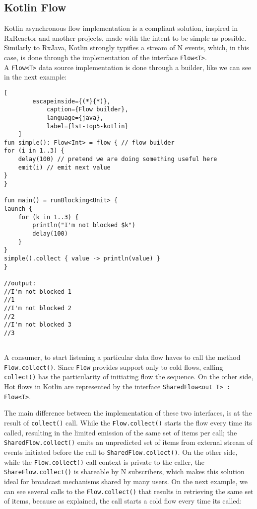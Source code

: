 \subsection{Kotlin Flow}

Kotlin asynchronous flow implementation is a \cite{ReactiveStreams} compliant solution, inspired in RxReactor and another projects, made with the intent to be simple as possible. Similarly to RxJava, Kotlin strongly typifies a stream of N events, which, in this case, is done through the implementation of the interface \texttt{Flow<T>}.\\
A \texttt{Flow<T>} data source implementation is done through a builder, like we can see in the next example:


\begin{center}
	\lstset{basicstyle=\scriptsize\ttfamily,frame=bottomline}
	\begin{minipage}[t][][b]{.46\textwidth}
	\begin{lstlisting}[
		escapeinside={(*}{*)},
			caption={Flow builder},
			language={java},
			label={lst-top5-kotlin}
	]
fun simple(): Flow<Int> = flow { // flow builder
for (i in 1..3) {
	delay(100) // pretend we are doing something useful here
	emit(i) // emit next value
}
}

fun main() = runBlocking<Unit> {
launch {
	for (k in 1..3) {
		println("I'm not blocked $k")
		delay(100)
	}
}
simple().collect { value -> println(value) } 
}

//output:
//I'm not blocked 1
//1
//I'm not blocked 2
//2
//I'm not blocked 3
//3
	
	\end{lstlisting}
	\end{minipage}
\end{center}


A consumer, to start listening a particular data flow haves to call the method \texttt{Flow.collect()}. Since \texttt{Flow} provides support only to cold flows, calling \texttt{collect()} has the particularity of initiating flow the sequence.
On the other side, Hot flows in Kotlin are represented by the interface \texttt{SharedFlow<out T> : Flow<T>}. 

The main difference between the implementation of these two interfaces, is at the result of \texttt{collect()} call. 
While the \texttt{Flow.collect()} starts the flow every time its called, resulting in the limited emission of the same set of items per call; the \texttt{SharedFlow.collect()} emits an unpredicted set of items from external stream of events initiated before the call to \texttt{SharedFlow.collect()}.
On the other side, while the \texttt{Flow.collect()} call context is private to the caller, the \texttt{ShareFlow.collect()} is shareable by N subscribers, which makes this solution ideal for broadcast mechanisms shared by many users.
On the next example, we can see several calls to the \texttt{Flow.collect()} that results in retrieving the same set of items, because as explained, the call starts a cold flow every time its called:


